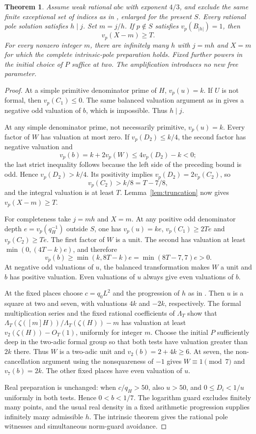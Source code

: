 \documentclass[11pt,a4paper]{article}
\newtheorem{theorem}{Theorem}[section]
\begin{document}
\begin{theorem}\label{thm:amplified}
Assume weak rational $abc$ with exponent $4/3$, and exclude the
same finite exceptional set of indices as in \cite{Index}, enlarged
for the present $S$. Every rational pole solution satisfies
$h\mid j$. Set $m=j/h$.
If $p\notin S$ satisfies $v_p(B_{|h|})=1$, then
\[
                              v_p(X-m)\ge T.
\]
For every nonzero integer $m$, there are infinitely many $h$
with $j=mh$ and $X=m$ for which the complete intrinsic-pole
preparation holds. Fixed further powers in the initial choice
of $P$ suffice at two. The amplification introduces no new
free parameter.
\end{theorem}
\begin{proof}
At a simple primitive denominator prime of $H$, $v_p(u)=k$.
If $U$ is not formal, then $v_p(C_1)\le0$. The same balanced
valuation argument as in \cite{Index} gives a negative odd
valuation of $b$, which is impossible. Thus $h\mid j$.

At any simple denominator prime, not necessarily primitive,
$v_p(u)=k$. Every factor of $W$ has valuation at most zero.
If $v_p(D_2)\le k/4$, the second factor has negative valuation
and
\[
 v_p(b)=k+2v_p(W)\le4v_p(D_2)-k<0;
\]
the last strict inequality follows because the left side of
the preceding bound is odd. Hence $v_p(D_2)>k/4$.
Its positivity implies $v_p(D_2)=2v_p(C_2)$, so
\[
                      v_p(C_2)>k/8=T-7/8,
\]
and the integral valuation is at least $T$.
Lemma~\ref{lem:truncation} now gives $v_p(X-m)\ge T$.

For completeness take $j=mh$ and $X=m$. At any positive odd
denominator depth $e=v_p(q_H^{-1})$ outside $S$, one has
$v_p(u)=ke$, $v_p(C_1)\ge2Te$ and $v_p(C_2)\ge Te$.
The first factor of $W$ is a unit. The second has valuation
at least $\min(0,(4T-k)e)$, and therefore
\[
 v_p(b)\ge\min(k,8T-k)e=\min(8T-7,7)e>0.
\]
At negative odd valuations of $u$, the balanced transformation
makes $W$ a unit and $b$ has positive valuation. Even
valuations of $u$ always give even valuations of $b$.

At the fixed places choose $c=q_0L^2$ and the progression of $h$
as in \cite{Index}. Then $u$ is a square at two and seven,
with valuations $4k$ and $-2k$, respectively. The formal
multiplication series and the fixed rational coefficients of
$\Lambda_T$ show that
$\Lambda_T(\zeta([m]H))/\Lambda_T(\zeta(H))-m$
has valuation at least $v_2(\zeta(H))-O_T(1)$, uniformly for
integer $m$. Choose the initial $P$ sufficiently deep in the
two-adic formal group so that both tests have valuation greater
than $2k$ there. Thus $W$ is a two-adic unit and
$v_2(b)=2+4k\ge6$.
At seven, the non-cancellation argument using the nonsquareness
of $-1$ gives $W\equiv1\pmod7$ and $v_7(b)=2k$.
The other fixed places have even valuation of $u$.

Real preparation is unchanged: when $c/q_H>50$, also $u>50$,
and $0\le D_i<1/u$ uniformly in both tests. Hence $0<b<1/7$.
The logarithm guard excludes finitely many points, and the
usual real density in a fixed arithmetic progression supplies
infinitely many admissible $h$. The intrinsic theorem gives
the rational pole witnesses and simultaneous norm-guard avoidance.
\end{proof}
\end{document}

